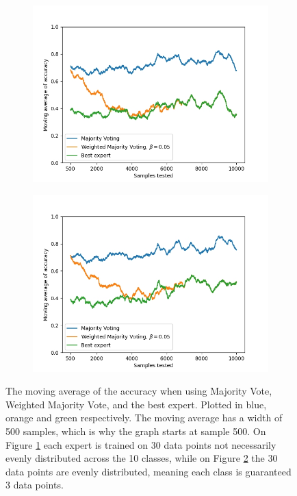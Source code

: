 \begin{figure}
    \begin{subfigure}{.5\textwidth}
        \centering
        \includegraphics[width=\linewidth]{figures/bias-1.jpg}
        \caption{}
        \label{fig:bias-a}
    \end{subfigure}
    \begin{subfigure}{.5\textwidth}
        \centering
        \includegraphics[width=\linewidth]{figures/bias-2.jpg}
        \caption{}
        \label{fig:bias-b}
    \end{subfigure}
    \caption{The moving average of the accuracy when using Majority Vote, Weighted Majority Vote, and the best expert. Plotted in blue, orange and green respectively. The moving average has a width of 500 samples, which is why the graph starts at sample 500. On Figure \ref{fig:bias-a} each expert is trained on 30 data points not necessarily evenly distributed across the 10 classes, while on Figure \ref{fig:bias-b} the 30 data points are evenly distributed, meaning each class is guaranteed 3 data points.}
    \label{fig:example-votes}
\end{figure} \label{fig:bias}

